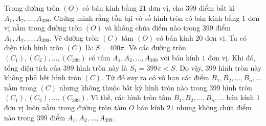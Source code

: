 \begin{ex}
{\textsf{} }
\end{ex}

\begin{ex}%
  Trong đường tròn $(O)$ có bán kính bằng $21$ đơn vị, cho $399$ điểm bất kì $A_1,A_2,\ldots,A_{399}.$ Chứng minh rằng tồn tại vô số hình tròn có bán kính bằng $1$ đơn vị nằm trong đường tròn $(O)$ và không chứa điểm nào trong $399$ điểm $A_1,A_2,\ldots,A_{399}.$
\loigiai
    {Vẽ đường tròn $(C)$ tâm $(O)$ có bán kính $20$ đơn vị. Ta có diện tích hình tròn $(C)$ là: $S=400\pi.$ 
  Vẽ các đường tròn $(C_1),(C_2),\ldots,(C_{399})$ có tâm $A_1,A_2,\ldots,A_{399}$ với bán kính $1$ đơn vị. Khi đó, tổng diện tích của $399$ hình tròn này là $S_1=399\pi<S.$
  Do vậy, $399$ hình tròn này không phủ hết hình tròn $(C).$ Từ đó suy ra có vô hạn các điểm $B_1,B_2,\ldots,B_n,\ldots$ nằm trong $(C)$ nhưng không thuộc bất kỳ hình tròn nào trong $399$ hình tròn $(C_1),(C_2),\ldots,(C_{399}).$
  Vì thế, các hình tròn tâm $B_1,B_2,\ldots,B_n,\ldots$ bán kính $1$ đơn vị luôn nằm trong đường tròn tâm $O$ bán kính $21$ nhưng không chứa điểm nào trong  
  $399$ điểm $A_1,A_2,\ldots,A_{399}.$  }
\end{ex}

